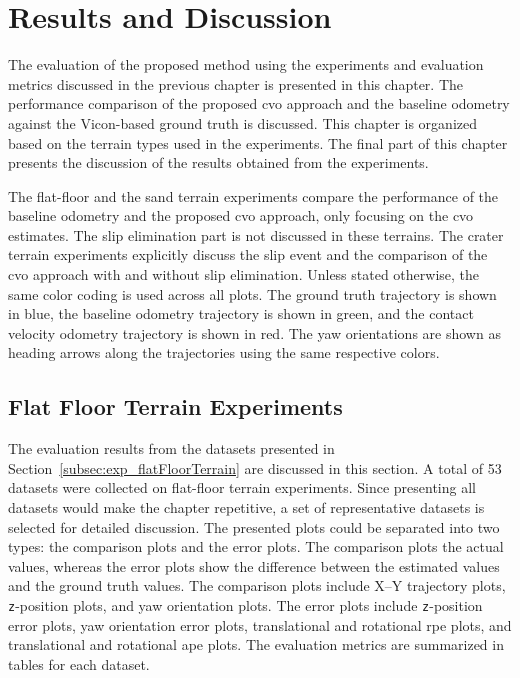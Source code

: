 \documentclass[report.tex]{subfiles}
\begin{document}
    \chapter{Results and Discussion} \label{chap:resultsanddiscussion}

    The evaluation of the proposed method using the experiments and evaluation metrics discussed in the previous chapter is presented in this chapter. The performance comparison of the proposed \gls{cvo} approach and the baseline odometry against the Vicon-based ground truth is discussed. This chapter is organized based on the terrain types used in the experiments. The final part of this chapter presents the discussion of the results obtained from the experiments. 
    
    The flat-floor and the sand terrain experiments compare the performance of the baseline odometry and the proposed \gls{cvo} approach, only focusing on the \gls{cvo} estimates. The slip elimination part is not discussed in these terrains. The crater terrain experiments explicitly discuss the slip event and the comparison of the \gls{cvo} approach with and without slip elimination. Unless stated otherwise, the same color coding is used across all plots. The ground truth trajectory is shown in blue, the baseline odometry trajectory is shown in green, and the contact velocity odometry trajectory is shown in red. The yaw orientations are shown as heading arrows along the trajectories using the same respective colors.
    
    \section{Flat Floor Terrain Experiments} \label{sec:flatFloorTerrainResults}   
    
    The evaluation results from the datasets presented in Section~\ref{subsec:exp_flatFloorTerrain} are discussed in this section. A total of 53 datasets were collected on flat-floor terrain experiments. Since presenting all datasets would make the chapter repetitive, a set of representative datasets is selected for detailed discussion. The presented plots could be separated into two types: the comparison plots and the error plots. The comparison plots the actual values, whereas the error plots show the difference between the estimated values and the ground truth values. The comparison plots include X--Y trajectory plots, \texttt{z}-position plots, and yaw orientation plots. The error plots include \texttt{z}-position error plots, yaw orientation error plots, translational and rotational \gls{rpe} plots, and translational and rotational \gls{ape} plots. The evaluation metrics are summarized in tables for each dataset.
    
\end{document}

